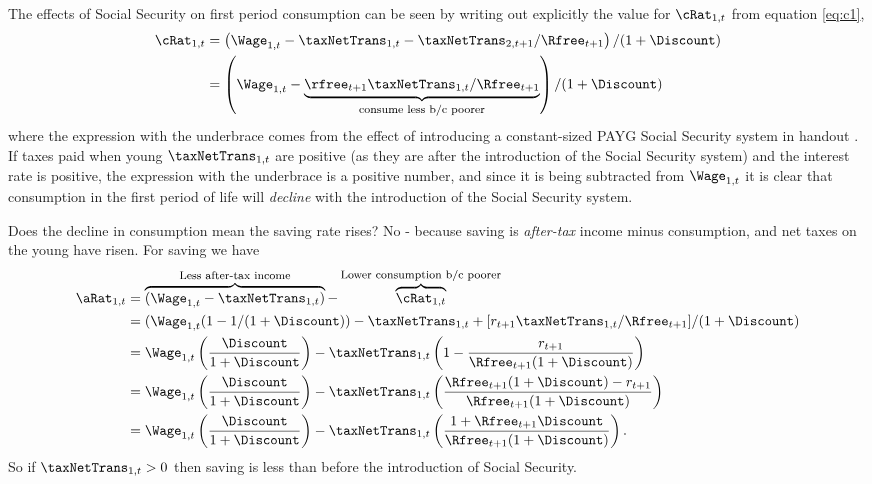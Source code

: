 \documentclass{handout}
\begin{document}
The effects of Social Security on first period consumption can be 
seen by writing out explicitly the value for $\cRat_{1,t}$ from equation \eqref{eq:c1}, 
\begin{equation}\begin{gathered}\begin{aligned}
        \cRat_{1,t} & =   \left(\Wage_{1,t}-\taxNetTrans_{1,t}-\taxNetTrans_{2,t+1}/\Rfree_{t+1}\right)/(1+\Discount)
\\       & =   \left(\Wage_{1,t}-\underbrace{\rfree_{t+1}\taxNetTrans_{1,t}/\Rfree_{t+1}}_{\mbox{\footnotesize consume less b/c poorer}}\right)/(1+\Discount)
\end{aligned}\end{gathered}\end{equation}
where the expression with the underbrace comes from the effect of
introducing a constant-sized PAYG Social Security system in handout
.  If taxes paid when young
$\taxNetTrans_{1,t}$ are positive (as they are after the introduction
of the Social Security system) and the interest rate is positive, the expression with the underbrace is
a positive number, and since it is being subtracted from $\Wage_{1,t}$
it is clear that consumption in the first period of life will {\it
  decline} with the introduction of the Social Security
system.

Does the decline in consumption mean the saving rate rises?  No - 
because saving is {\it after-tax} income minus consumption, and net 
taxes on the young have risen.  For saving we have
\begin{equation}\begin{gathered}\begin{aligned}
        \aRat_{1,t} & =  \overbrace{(\Wage_{1,t}-\taxNetTrans_{1,t})}^{\mbox{\footnotesize Less after-tax income}} - \overbrace{\cRat_{1,t}}^{\mbox{\footnotesize Lower consumption b/c poorer}}  \\
         & =  (\Wage_{1,t}(1-1/(1+\Discount)) - \taxNetTrans_{1,t}+  [r_{t+1}\taxNetTrans_{1,t}/\Rfree_{t+1}]/(1+\Discount)  \\
         & =  \Wage_{1,t}\left(\frac{\Discount}{1+\Discount}\right)-\taxNetTrans_{1,t}\left(1-\frac{r_{t+1}}{\Rfree_{t+1}(1+\Discount)}\right)  \\
         & =  \Wage_{1,t}\left(\frac{\Discount}{1+\Discount}\right)-\taxNetTrans_{1,t}\left(\frac{\Rfree_{t+1}(1+\Discount)-r_{t+1}}{\Rfree_{t+1}(1+\Discount)}\right)  \\
         & =  \Wage_{1,t}\left(\frac{\Discount}{1+\Discount}\right)-\taxNetTrans_{1,t}\left(\frac{1+\Rfree_{t+1}\Discount}{\Rfree_{t+1}(1+\Discount)}\right).
\end{aligned}\end{gathered}\end{equation}
So if $\taxNetTrans_{1,t}>0$ then saving is less than before the introduction of 
Social Security.
\end{document}
